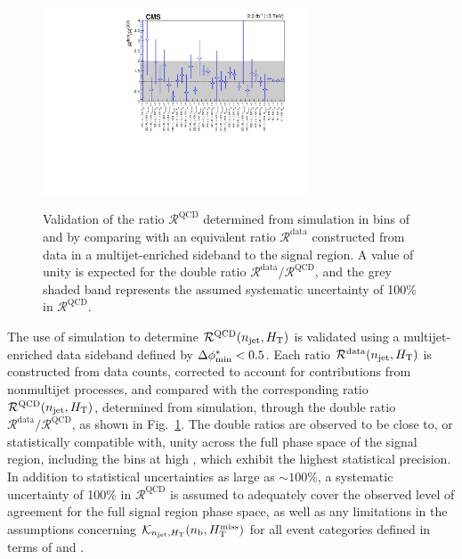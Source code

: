 \begin{figure}[!t]
  \begin{center}
    \includegraphics[width=0.7\textwidth]{figures/qcd/v1/DoubleRatioQCD_noEmpty} \\
  \end{center}
  \caption{Validation of the ratio $\mathcal{R}^\text{QCD}$ determined
    from simulation in bins of \njet and \scalht by comparing with an
    equivalent ratio $\mathcal{R}^\text{data}$ constructed from data 
    in a multijet-enriched sideband to the signal region. A value of
    unity is expected for the double ratio $\mathcal{R}^\text{data} /
    \mathcal{R}^\text{QCD}$, and the grey shaded band represents the
    assumed systematic uncertainty of 100\% in
    $\mathcal{R}^\text{QCD}$. 
  }
  \label{fig:qcd} 
\end{figure}

The use of simulation to determine $\mathcal{R}^\text{QCD}(n_{\text{jet}},
H_{\mathrm{T}})$ is validated using a multijet-enriched data sideband defined
by $\mbox{$\Delta\phi^{*}_{\rm min}$} < 0.5$.
Each ratio $\mathcal{R}^\text{data}(n_{\text{jet}}, H_{\mathrm{T}})$ is constructed
from data counts, corrected to account for contributions from
nonmultijet processes, and compared with the corresponding ratio
$\mathcal{R}^\text{QCD}(n_{\text{jet}}, H_{\mathrm{T}})$, determined from simulation,
through the double ratio
$\mathcal{R}^\text{data}/\mathcal{R}^\text{QCD}$, as shown in
Fig.~\ref{fig:qcd}. The double ratios are observed to be close to, or
statistically compatible with, unity across the full phase space of
the signal region, including the bins at high \scalht, which exhibit
the highest statistical precision. In addition to statistical
uncertainties as large as $\sim 100\%$, a systematic uncertainty of
100\% in $\mathcal{R}^\text{QCD}$ is assumed to adequately cover the
observed level of agreement for the full signal region phase space, as
well as any limitations in the assumptions concerning
$\mathcal{K}_{n_{\text{jet}}, H_{\mathrm{T}}}(n_{\text{b}}, H_{\text{T}}^{\text{miss}})$ for all event categories
defined in terms of \njet and \scalht.


